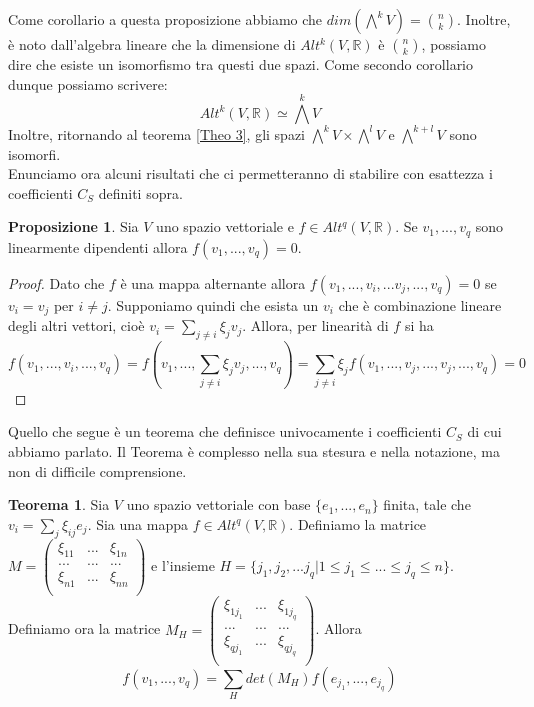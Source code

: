 \documentclass[12pt,a4paper]{report}
\theoremstyle{definition}
\theoremstyle{Theorem}
\newtheorem{Theo}[Def]{Teorema}
\newtheorem{Prop}[Def]{Proposizione}
\theoremstyle{definition}
\theoremstyle{definition}
\theoremstyle{definition}
\begin{document}
Come corollario a questa proposizione abbiamo che $dim(\bigwedge^kV)={n\choose k}$.
Inoltre, è noto dall'algebra lineare che la dimensione di $Alt^k(V,\mathbb{R})$ è ${n\choose k}$, possiamo dire che esiste un isomorfismo tra questi due spazi. Come secondo corollario dunque possiamo scrivere: 
$$Alt^k(V,\mathbb{R})\simeq \bigwedge^kV$$ 
Inoltre, ritornando al teorema \ref{Theo 3}, gli spazi $\bigwedge^kV\times\bigwedge^lV$ e $\bigwedge^{k+l}V$ sono isomorfi.\\
Enunciamo ora alcuni risultati che ci permetteranno di stabilire con esattezza i coefficienti $C_S$ definiti sopra.
\begin{Prop}
	Sia $V$ uno spazio vettoriale e $f\in Alt^q(V,\mathbb{R})$. Se $v_1,...,v_q$ sono linearmente dipendenti allora $f(v_1,...,v_q)=0.$
\end{Prop}
\begin{proof}
	Dato che $f$ è una mappa alternante allora $f(v_1,...,v_i,...v_j,...,v_q)=0$ se $v_i=v_j$ per $i\neq j$. Supponiamo quindi che esista un $v_i$ che è combinazione lineare degli altri vettori, cioè $v_i=\sum_{j\neq i}\xi_jv_j$. Allora, per linearità di $f$ si ha
	$$f(v_1,...,v_i,...,v_q)=f(v_1,...,\sum_{j\neq i}\xi_jv_j,...,v_q)=\sum_{j\neq i}\xi_jf(v_1,...,v_j,...,v_j,...,v_q)=0$$
\end{proof}
Quello che segue è un teorema che definisce univocamente i coefficienti $C_S$ di cui abbiamo parlato. Il Teorema è complesso nella sua stesura e nella notazione, ma non di difficile comprensione.
\begin{Theo}\label{Theo 2}
	Sia $V$ uno spazio vettoriale con base $\{e_1,...,e_n\}$ finita, tale che $v_i=\sum_{j}\xi_{ij}e_j$. Sia una mappa $f\in Alt^q(V,\mathbb{R})$. Definiamo la matrice 
	$M=\begin{pmatrix}
		\xi_{11} &...& \xi_{1n}\\
		... &...& ...\\
		\xi_{n1} &...& \xi_{nn}\\
	\end{pmatrix}$ e l'insieme $H=\{j_1,j_2,...j_q|1\leq j_1\le...\le j_q\leq n\}$. Definiamo ora la matrice 
	$M_H=\begin{pmatrix}
		\xi_{1j_1} &...& \xi_{1j_q}\\
		... &...& ...\\
		\xi_{qj_1} &...& \xi_{qj_q}\\
	\end{pmatrix}$. Allora 
$$f(v_1,...,v_q)=\sum_{H}det(M_H)f(e_{j_1},...,e_{j_q})$$
\end{Theo}
\end{document}
